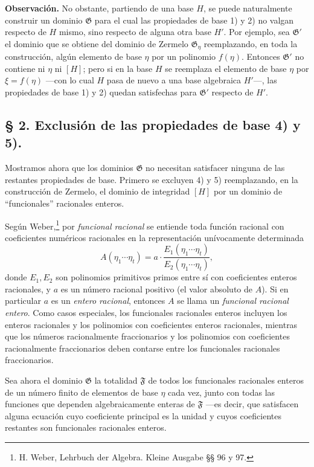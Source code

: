 \documentclass[11pt]{article}
\begin{document}
\textbf{Observación.} No obstante, partiendo de una base $H$, se puede naturalmente construir un dominio $\mathfrak G$ para el cual las propiedades de base 1) y 2) no valgan respecto de $H$ mismo, sino respecto de alguna otra base $H'$. Por ejemplo, sea $\mathfrak G'$ el dominio que se obtiene del dominio de Zermelo $\mathfrak G_\eta$ reemplazando, en toda la construcción, algún elemento de base $\eta$ por un polinomio $f(\eta)$. Entonces $\mathfrak G'$ no contiene ni $\eta$ ni $[H]$; pero si en la base $H$ se reemplaza el elemento de base $\eta$ por $\xi=f(\eta)$ ---con lo cual $H$ pasa de nuevo a una base algebraica $H'$---, las propiedades de base 1) y 2) quedan satisfechas para $\mathfrak G'$ respecto de $H'$.

\subsection*{§ 2. Exclusión de las propiedades de base 4) y 5).}

Mostramos ahora que los dominios $\mathfrak G$ no necesitan satisfacer ninguna de las restantes propiedades de base. Primero se excluyen 4) y 5) reemplazando, en la construcción de Zermelo, el dominio de integridad $[H]$ por un dominio de ``funcionales'' racionales enteros.

Según Weber,\footnote{H. Weber, Lehrbuch der Algebra. Kleine Ausgabe §§ 96 y 97.} por \emph{funcional racional} se entiende toda función racional con coeficientes numéricos racionales en la representación unívocamente determinada
\[
 A(\eta_1\cdots \eta_t)
   = a\cdot\frac{E_1(\eta_1\cdots \eta_t)}{E_2(\eta_1\cdots \eta_t)},
\]
donde $E_1,E_2$ son polinomios primitivos primos entre sí con coeficientes enteros racionales, y $a$ es un número racional positivo (el valor absoluto de $A$). Si en particular $a$ es un \emph{entero racional}, entonces $A$ se llama un \emph{funcional racional entero}. Como casos especiales, los funcionales racionales enteros incluyen los enteros racionales y los polinomios con coeficientes enteros racionales, mientras que los números racionalmente fraccionarios y los polinomios con coeficientes racionalmente fraccionarios deben contarse entre los funcionales racionales fraccionarios.

Sea ahora el dominio $\mathfrak G$ la totalidad $\mathfrak F$ de todos los funcionales racionales enteros de un número finito de elementos de base $\eta$ cada vez, junto con todas las funciones que dependen algebraicamente enteras de $\mathfrak F$ ---es decir, que satisfacen alguna ecuación cuyo coeficiente principal es la unidad y cuyos coeficientes restantes son funcionales racionales enteros.
\end{document}
